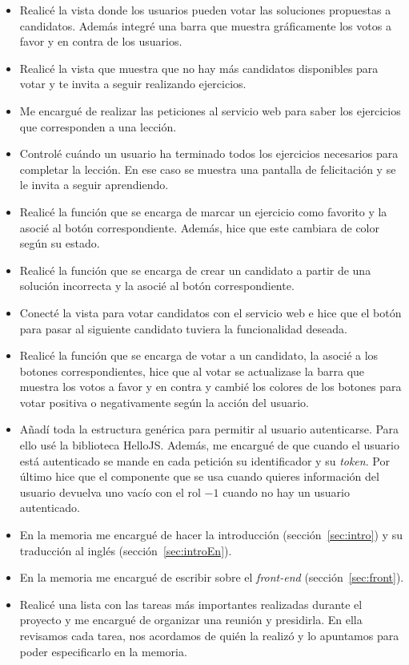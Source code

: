 \begin{itemize}
\item
Realicé la vista donde los usuarios pueden votar las soluciones propuestas a candidatos. Además integré una barra que muestra gráficamente los votos a favor y en contra de los usuarios.

\item 
Realicé la vista que muestra que no hay más candidatos disponibles para votar y te invita a seguir realizando ejercicios.

\item
Me encargué de realizar las peticiones al servicio web para saber los ejercicios que corresponden a una lección.

\item
Controlé cuándo un usuario ha terminado todos los ejercicios necesarios para completar la lección. En ese caso se muestra una pantalla de felicitación y se le invita a seguir aprendiendo.

\item
Realicé la función que se encarga de marcar un ejercicio como favorito y la asocié al botón correspondiente. Además, hice que este cambiara de color según su estado.

\item
Realicé la función que se encarga de crear un candidato a partir de una solución incorrecta y la asocié al botón correspondiente.

\item
Conecté la vista para votar candidatos con el servicio web e hice que el botón para pasar al siguiente candidato tuviera la funcionalidad deseada.

\item
Realicé la función que se encarga de votar a un candidato, la asocié a los botones correspondientes, hice que al votar se actualizase la barra que muestra los votos a favor y en contra y cambié los colores de los botones para votar positiva o negativamente según la acción del usuario.

\item
Añadí toda la estructura genérica para permitir al usuario autenticarse. Para ello usé la biblioteca HelloJS. Además, me encargué de que cuando el usuario está autenticado se mande en cada petición su identificador y su \emph{token}. Por último hice que el componente que se usa cuando quieres información del usuario devuelva uno vacío con el rol $-1$ cuando no hay un usuario autenticado.


\item
En la memoria me encargué de hacer la introducción (sección~\ref{sec:intro}) y su traducción al inglés (sección~\ref{sec:introEn}).

\item
En la memoria me encargué de escribir sobre el \emph{front-end} (sección~\ref{sec:front}).

\item
Realicé una lista con las tareas más importantes realizadas durante el proyecto y me encargué de organizar una reunión y presidirla. En ella revisamos cada tarea, nos acordamos de quién la realizó y lo apuntamos para poder especificarlo en la memoria.

\end{itemize}
